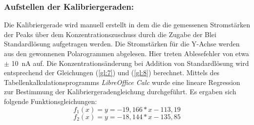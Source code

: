 	\subsubsection*{Aufstellen der Kalibriergeraden:}
	Die Kalibriergerade wird manuell erstellt in dem die die gemessenen Stromstärken der Peaks über dem Konzentrationszuschuss durch die Zugabe der Blei Standardlösung aufgetragen werden. Die Stromstärken für die Y-Achse werden aus den gewonnenen Polarogrammen abgelesen. Hier treten Ablesefehler von etwa $\pm$ \SI{10}{\nano\ampere} auf. Die Konzentrationsänderung bei Addition von Standardlösung wird entsprechend der Gleichungen (\ref{gl:7}) und (\ref{gl:8}) berechnet. Mittels des Tabellenkalkulationsprogramms \textit{LibreOffice Calc} wurde eine lineare Regression zur Bestimmung der Kalibriergeradengleichung durchgeführt. Es ergaben sich folgende Funktionsgleichungen:
	$$f_1(x)=y=-19,166*x - 113,19 $$ 
	$$f_2(x)=y=-18,144*x - 135,85 $$ 
	
%				
	
